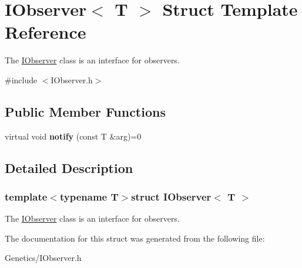 \hypertarget{struct_i_observer}{}\section{I\+Observer$<$ T $>$ Struct Template Reference}
\label{struct_i_observer}


The \hyperlink{struct_i_observer}{I\+Observer} class is an interface for observers.  




{\ttfamily \#include $<$I\+Observer.\+h$>$}

\subsection*{Public Member Functions}
\begin{DoxyCompactItemize}
\item 
\hypertarget{struct_i_observer_a218fcc53f11b591e002c7f3552b26a78}{}virtual void {\bfseries notify} (const T \&arg)=0\label{struct_i_observer_a218fcc53f11b591e002c7f3552b26a78}

\end{DoxyCompactItemize}


\subsection{Detailed Description}
\subsubsection*{template$<$typename T$>$struct I\+Observer$<$ T $>$}

The \hyperlink{struct_i_observer}{I\+Observer} class is an interface for observers. 

The documentation for this struct was generated from the following file\+:\begin{DoxyCompactItemize}
\item 
Genetics/I\+Observer.\+h\end{DoxyCompactItemize}
